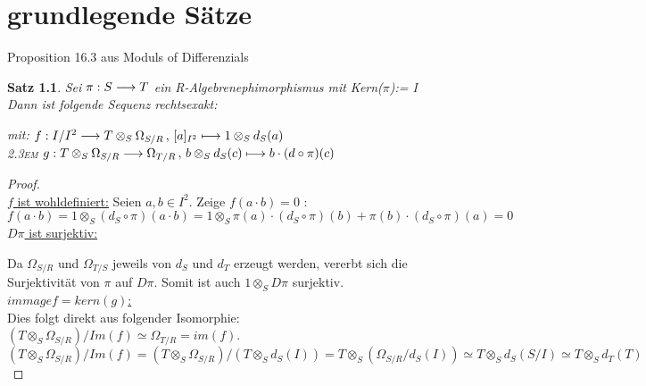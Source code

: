 \documentclass[10pt,a4paper]{report}
\newcounter{Aussage}[chapter]
\newtheorem{satz}[Aussage]{Satz}
\newcommand{\functionfront}[3]{\nolinebreak{#1:#2 \longrightarrow #3}}
\newcommand{\function}[5]{\nolinebreak{#1:#2 \longrightarrow #3 \, , \, #4 \longmapsto #5}}
\newcommand{\divR}[2]{\Omega_{#1/#2}}
\newcommand{\tensor}[3]{#1 \otimes_{#2} #3}
\newcommand{\kernel}[1]{kern(#1)}
\newcommand{\immage}[1]{im(#1)}
\begin{document}
\chapter{grundlegende Sätze}
Proposition 16.3 aus Moduls of Differenzials
\begin{satz}
\raggedright
Sei $\functionfront{\pi}{S}{T}$ ein R-Algebrenephimorphismus mit Kern($\pi$):= I \\
Dann ist folgende Sequenz rechtsexakt: \\
\begin{center}
\end{center}
\begin{spacing}{1.5}
mit: $\function{f}{I/I^2}{{\tensor{T}{S}{\divR{S}{R}}}}{[a]_{I^2}}{\tensor{1}{S}{d_S(a)}}$\\
\textsc{\leftskip2.3em} $\function{g}{\tensor{T}{S}{\divR{S}{R}}}{\divR{T}{R}}{\tensor{b}{S}{d_S(c)}}{b \cdot (d \circ \pi)(c)}$
\end{spacing}
\end{satz}

\begin{proof} \ \\
\underline{$f$ ist wohldefiniert:} Seien $a,b\in I^2$. Zeige $f(a \cdot b)=0$ :
$$ f(a \cdot b) =
\tensor{1}{S}{( d_S \circ \pi )(a \cdot b)} =
\tensor{1}{S}{\pi(a) \cdot (d_S \circ \pi )(b) + \pi(b) \cdot ( d_S \circ \pi )(a)} =0$$
\underline{$D\pi$ ist surjektiv:}

\begin{center}
\end{center}
Da $\divR{S}{R}$ und $\divR{T}{S}$ jeweils von $d_S$ und $d_T$ erzeugt werden, vererbt sich die Surjektivität von $\pi$ auf $D\pi$. Somit ist auch $\tensor{1}{S}{D\pi}$ surjektiv.\\
\underline{$immage{f}=\kernel{g}$:}\\ Dies folgt direkt aus folgender Isomorphie: $(\tensor{T}{S}{\divR{S}{R}})/Im(f) \simeq \divR{T}{R} = \immage{f}$.
$$(\tensor{T}{S}{\divR{S}{R}})/Im(f) = (\tensor{T}{S}{\divR{S}{R}})/(\tensor{T}{S}{d_S(I)}) = \tensor{T}{S}{(\divR{S}{R}/d_S(I))} \simeq \tensor{T}{S}{d_S(S/I)} \simeq \tensor{T}{S}{d_T(T)}$$
\end{proof}
\end{document}
